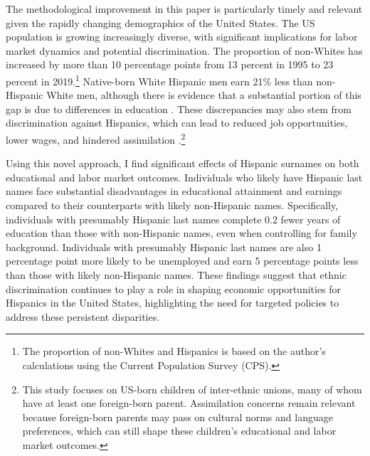 The methodological improvement in this paper is particularly timely and relevant given the rapidly changing demographics of the United States. The US population is growing increasingly diverse, with significant implications for labor market dynamics and potential discrimination. The proportion of non-Whites has increased by more than 10 percentage points from 13 percent in 1995 to 23 percent in 2019.\footnote{The proportion of non-Whites and Hispanics is based on the author's calculations using the Current Population Survey (CPS).} Native-born White Hispanic men earn 21\% less than non-Hispanic White men, although there is evidence that a substantial portion of this gap is due to differences in education \autocite{duncan2006hispanics, duncan2018identifying, duncan2018socioeconomic}. These discrepancies may also stem from discrimination against Hispanics, which can lead to reduced job opportunities, lower wages, and hindered assimilation \autocite{chettyWhereLandOpportunity2014,bowles2002inheritance, djajic2003assimilation}.\footnote{This study focuses on US-born children of inter-ethnic unions, many of whom have at least one foreign-born parent. Assimilation concerns remain relevant because foreign-born parents may pass on cultural norms and language preferences, which can still shape these children's educational and labor market outcomes.}

 Using this novel approach, I find significant effects of Hispanic surnames on both educational and labor market outcomes. Individuals who likely have Hispanic last names face substantial disadvantages in educational attainment and earnings compared to their counterparts with likely non-Hispanic names. Specifically, individuals with presumably Hispanic last names complete 0.2 fewer years of education than those with non-Hispanic names, even when controlling for family background. Individuals with presumably Hispanic last names are also 1 percentage point more likely to be unemployed and earn 5 percentage points less than those with likely non-Hispanic names. These findings suggest that ethnic discrimination continues to play a role in shaping economic opportunities for Hispanics in the United States, highlighting the need for targeted policies to address these persistent disparities.

